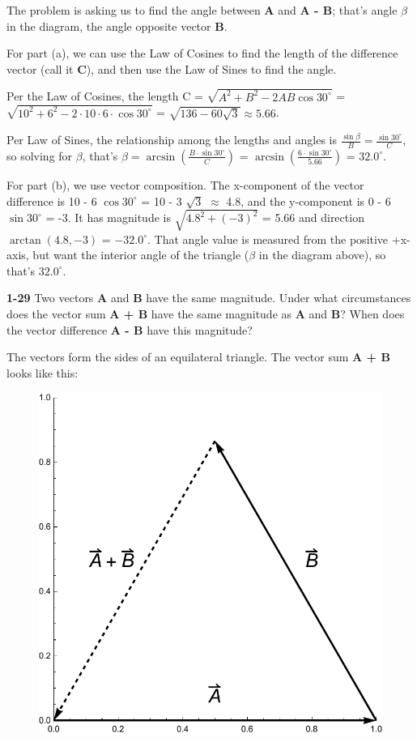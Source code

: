 \documentclass{amsart}
\begin{document}
The problem is asking us to find the angle between \textbf{A} and \textbf{A - B}; that's angle $\beta$ in the diagram,
the angle opposite vector \textbf{B}.

For part (a), we can use the Law of Cosines to find the length of the difference vector (call it \textbf{C}), and then use the Law of Sines to
find the angle.

Per the Law of Cosines, the length C = $\sqrt{A^2 + B^2 - 2 A B \cos 30^\circ}$ =
$\sqrt{10^2 + 6^2 - 2\cdot10\cdot6\cdot\cos 30^\circ}$ = $\sqrt{136 - 60 \sqrt{3}} \approx 5.66$.

Per Law of Sines, the relationship among the lengths and angles is $\frac{\sin \beta}{B} = \frac{\sin 30^\circ}{C}$,
so solving for $\beta$, that's $\beta = \arcsin \left( \frac{B \cdot \sin 30^\circ}{C} \right)$ =
$\arcsin \left( \frac{6 \cdot \sin 30^\circ}{5.66} \right)$ = $32.0^\circ$.

For part (b), we use vector composition.
The x-component of the vector difference is 10 - 6 $\cos 30^\circ$ = 10 - 3 $\sqrt{3}$ $\approx$ 4.8,
and the y-component is 0 - 6 $\sin 30^\circ$ = -3.
It has magnitude is $\sqrt{4.8^2 + (-3)^2}$ = 5.66 and direction $\arctan (4.8,-3)$ = $-32.0^\circ$.
That angle value is measured from the positive +x-axis, but want the interior angle of the
triangle ($\beta$ in the diagram above), so that's $32.0^\circ$.

\textbf{1-29} Two vectors \textbf{A} and \textbf{B} have the same magnitude.
Under what circumstances does the vector sum \textbf{A + B} have the same magnitude as \textbf{A} and \textbf{B}?
When does the vector difference \textbf{A - B} have this magnitude?

The vectors form the sides of an equilateral triangle.  The vector sum \textbf{A + B} looks like this:

\begin{figure}[h]
\includegraphics[scale=0.32]{1-29a}
\end{figure}
\end{document}
